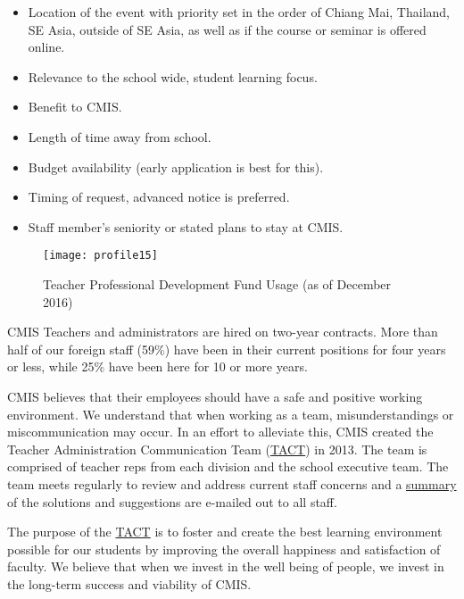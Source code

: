 \begin{itemize}
\item Location of the event with priority set in the order of Chiang Mai, Thailand, SE Asia, outside of SE Asia, as well as if the course or seminar is offered online.
\item Relevance to the school wide, student learning focus.
\item Benefit to CMIS.
\item Length of time away from school.
\item Budget availability (early application is best for this).
\item Timing of request, advanced notice is preferred.
\item Staff member’s seniority or stated plans to stay at CMIS.
\end{itemize}

\begin{figure}
\centering
\texttt{[image: profile15]}
\caption{Teacher Professional Development Fund Usage (as of December 2016)}
\end{figure}

CMIS Teachers and administrators are hired on two-year contracts.  More than half of our foreign staff (59\%) have been in their current positions for four years or less, while 25\% have been here for 10 or more years. 


CMIS believes that their employees should have a safe and positive working environment. We understand that when working as a team, misunderstandings or miscommunication may occur.  In an effort to alleviate this, CMIS created the Teacher Administration Communication Team (\href{https://docs.google.com/a/cmis.ac.th/document/d/14nhwcw8xo3i-23Q-WUxo6KJ_c8yFKu-jTdCctt4MFcs/edit?usp=sharing}{TACT}) in 2013. The team is comprised of teacher reps from each division and the school executive team. The team meets regularly to review and address current staff concerns and a \href{https://docs.google.com/a/cmis.ac.th/document/d/1KLB4c5_LkxXzq4vP2EuNhBVPp2q_FT9qy1cBBwaS5JM/edit?usp=sharing}{summary} of the solutions and suggestions are e-mailed out to all staff.

The purpose of the \href{https://docs.google.com/document/d/12ZwL4geAPTDcm-SI6U1fRpXEKxKZ-61q54upcikt6lc/edit}{TACT} is to foster and create the best learning environment possible for our students by improving the overall happiness and satisfaction of faculty. We believe that when we invest in the well being of people, we invest in the long-term success and viability of CMIS.

